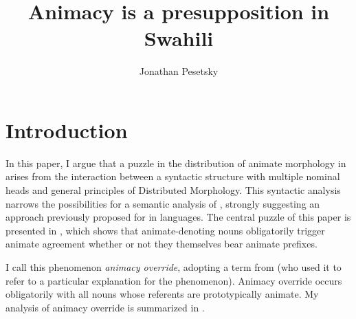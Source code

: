 \documentclass[output=paper,newtxmath,modfonts,nonflat,hidelinks]{langsci/langscibook}
\author{Jonathan Pesetsky \affiliation{ILLC, University of Amsterdam} }
\title{Animacy is a presupposition in Swahili}
\begin{document}
\maketitle

\section{Introduction} \label{sec:pesetsky:introduction}
 
In this paper, I argue that a puzzle in the distribution of animate morphology in  arises from the interaction between a syntactic structure with multiple nominal heads and general principles of Distributed Morphology.  This syntactic analysis narrows the possibilities for a semantic analysis of , strongly suggesting an approach previously proposed for  in  languages. The central puzzle of this paper is presented in , which shows that  animate-denoting nouns obligatorily trigger animate agreement whether or not they themselves bear animate prefixes. 

 \ea\label{ex:pesetsky:kiongoziintro}
 
\z \z
 
I call this phenomenon \textit{animacy override}, adopting a term from \citet{carstens91} (who used it to refer to a particular explanation for the phenomenon).  Animacy override occurs obligatorily with all nouns whose referents are prototypically animate.  My analysis of animacy override is summarized in .

 \ea\label{ex:pesetsky:theproposal}
 \z \z
\end{document}
